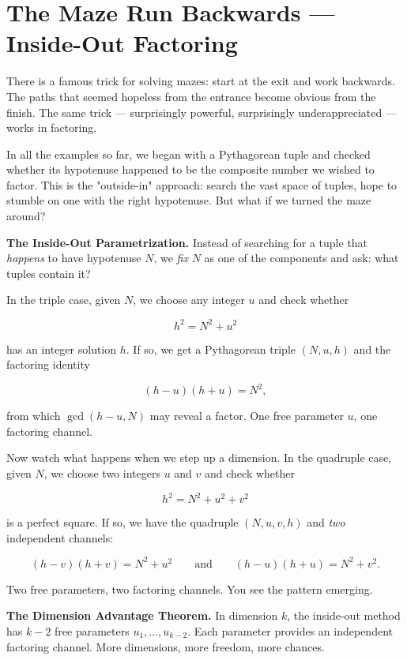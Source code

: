 \bigskip

\section*{The Maze Run Backwards --- Inside-Out Factoring}

There is a famous trick for solving mazes: start at the exit and work backwards. The paths that seemed hopeless from the entrance become obvious from the finish. The same trick --- surprisingly powerful, surprisingly underappreciated --- works in factoring.

In all the examples so far, we began with a Pythagorean tuple and checked whether its hypotenuse happened to be the composite number we wished to factor. This is the "outside-in" approach: search the vast space of tuples, hope to stumble on one with the right hypotenuse. But what if we turned the maze around?

\textbf{The Inside-Out Parametrization.} Instead of searching for a tuple that \textit{happens} to have hypotenuse $N$, we \textit{fix} $N$ as one of the components and ask: what tuples contain it?

In the triple case, given $N$, we choose any integer $u$ and check whether

\[
h^2 = N^2 + u^2
\]

has an integer solution $h$. If so, we get a Pythagorean triple $(N, u, h)$ and the factoring identity

\[
(h - u)(h + u) = N^2,
\]

from which $\gcd(h - u, N)$ may reveal a factor. One free parameter $u$, one factoring channel.

Now watch what happens when we step up a dimension. In the quadruple case, given $N$, we choose two integers $u$ and $v$ and check whether

\[
h^2 = N^2 + u^2 + v^2
\]

is a perfect square. If so, we have the quadruple $(N, u, v, h)$ and \textit{two} independent channels:

\[
(h - v)(h + v) = N^2 + u^2 \qquad \text{and} \qquad (h - u)(h + u) = N^2 + v^2.
\]

Two free parameters, two factoring channels. You see the pattern emerging.


\begin{displayquote}
\textbf{The Dimension Advantage Theorem.} In dimension $k$, the inside-out method has $k - 2$ free parameters $u_1, \ldots, u_{k-2}$. Each parameter provides an independent factoring channel. More dimensions, more freedom, more chances.
\end{displayquote}


